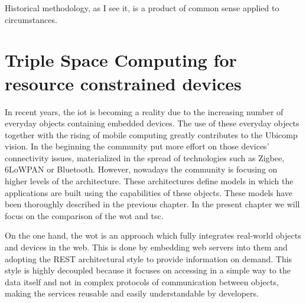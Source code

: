 

\begin{savequote}[50mm]
Historical methodology, as I see it, is a product of common sense applied to circumstances. 
\end{savequote}


\newcommand{\codigo}[1]{``\texttt{#1}''}
\newcommand{\primquery}{\emph{query}}
\newcommand{\primread}{\emph{read}}
\newcommand{\primtake}{\emph{take}}
\newcommand{\primwrite}{\emph{write}}


\chapter{Triple Space Computing for resource constrained devices}
\label{cha:tsc}
\newcommand{\pathchapthree}{3_tsc}

\ifpdf
    \graphicspath{{\pathchapthree/figures/PNG/}{\pathchapthree/figures/PDF/}{\pathchapthree/figures/}}
\else
    \graphicspath{{\pathchapthree/figures/EPS/}{\pathchapthree/figures/}}
\fi




In recent years, the \acf{iot} is becoming a reality due to the increasing number of everyday objects containing embedded devices.
The use of these everyday objects together with the rising of mobile computing greatly contributes to the Ubicomp vision.
In the beginning the community put more effort on those devices' connectivity issues, materialized in the spread of technologies such as Zigbee, 6LoWPAN or Bluetooth.
However, nowadays the community is focusing on higher levels of the architecture.
These architectures define models in which the applications are built using the capabilities of these objects.
These models have been thoroughly described in the previous chapter.
In the present chapter we will focus on the comparison of the \acf{wot} and \acf{tsc}.

On the one hand, the \ac{wot} is an approach which fully integrates real-world objects and devices in the web.
This is done by embedding web servers into them and adopting the REST architectural style to provide information on demand.
This style is highly decoupled because it focuses on accessing in a simple way to the data itself and not in complex protocols of communication between objects, making the services reusable and easily understandable by developers.

